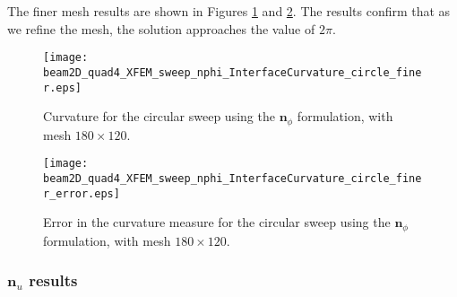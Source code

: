 The finer mesh results are shown in Figures \ref{fig:beam2D_quad4_XFEM_sweep_nphi_InterfaceCurvature_circle_finer} and \ref{fig:beam2D_quad4_XFEM_sweep_nphi_InterfaceCurvature_circle_finer_error}. The results confirm that as we refine the mesh, the solution approaches the value of $2\pi$.
%
\begin{figure}[H]
	\centering
	\texttt{[image: beam2D\_quad4\_XFEM\_sweep\_nphi\_InterfaceCurvature\_circle\_finer.eps]}
	\caption{Curvature for the circular sweep using the $\mathbf{n}_{\phi}$ formulation, with mesh $180 \times 120$.}
	\label{fig:beam2D_quad4_XFEM_sweep_nphi_InterfaceCurvature_circle_finer}
\end{figure}
%
\begin{figure}[H]
	\centering
	\texttt{[image: beam2D\_quad4\_XFEM\_sweep\_nphi\_InterfaceCurvature\_circle\_finer\_error.eps]}
	\caption{Error in the curvature measure for the circular sweep using the $\mathbf{n}_{\phi}$ formulation, with mesh $180 \times 120$.}
	\label{fig:beam2D_quad4_XFEM_sweep_nphi_InterfaceCurvature_circle_finer_error}
\end{figure}
%

\subsubsection{$\mathbf{n}_{u}$ results}
\label{sec:nnrm_results}


